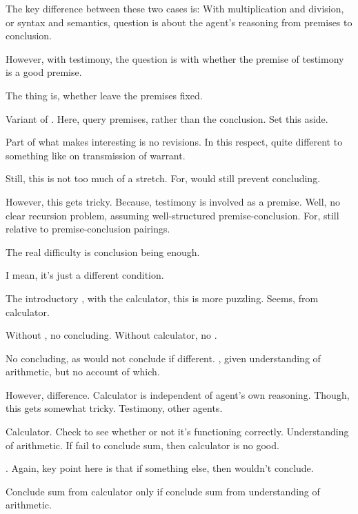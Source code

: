 \begin{note}
  The key difference between these two cases is:
  With multiplication and division, or syntax and semantics, question is about the agent's reasoning from premises to conclusion.

  However, with testimony, the question is with whether the premise of testimony is a good premise.

  The thing is, whether leave the premises fixed.

  Variant of \zS{}.
  Here, query premises, rather than the conclusion.
  Set this aside.

  Part of what makes \zS{} interesting is no revisions.
  In this respect, quite different to something like \citeauthor{Wright:2011wn} on transmission of warrant.

  Still, this is not too much of a stretch.
  For, would still prevent concluding.

  However, this gets tricky.
  Because, testimony is involved as a premise.
  Well, no clear recursion problem, assuming well-structured premise-conclusion.
  For, \zS{} still relative to premise-conclusion pairings.

  The real difficulty is conclusion being enough.

  I mean, it's just a different condition.
\end{note}

\begin{note}
  The introductory , with the calculator, this is more puzzling.
  Seems,  from calculator.

   Without , no concluding.
  Without calculator, no .

  No concluding, as would not conclude if different.
  , given understanding of arithmetic, but no account of which.

  However, difference.
  Calculator is independent of agent's own reasoning.
  Though, this gets somewhat tricky.
  Testimony, other agents.
\end{note}

\begin{note}
  Calculator.
  Check to see whether or not it's functioning correctly.
  Understanding of arithmetic.
  If fail to conclude sum, then calculator is no good.

  \zS{}.
  Again, key point here is that if something else, then wouldn't conclude.

  Conclude sum from calculator only if conclude sum from understanding of arithmetic.
\end{note}

